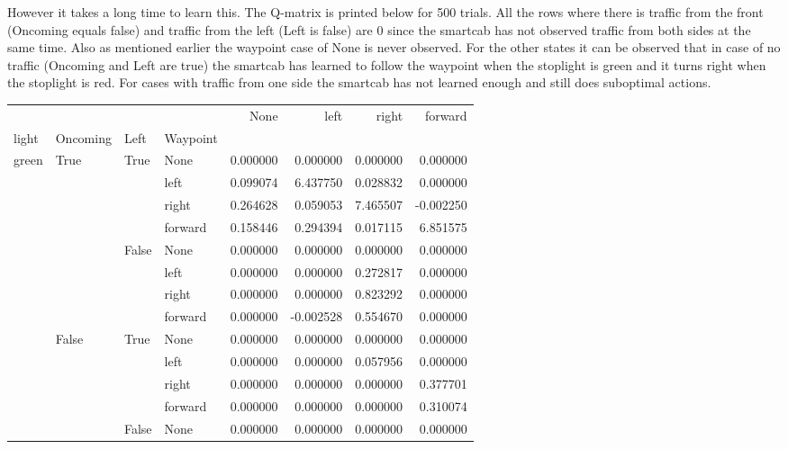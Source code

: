 \documentclass{article}
\begin{document}
However it takes a long time to learn this. The Q-matrix is printed below for 500 trials. All the rows where there is traffic from the front (Oncoming equals false) and traffic from the left (Left is false) are 0 since the smartcab has not observed traffic from both sides at the same time. Also as mentioned earlier the waypoint case of None is never observed. For the other states it can be observed that in case of no traffic (Oncoming and Left are true) the smartcab has learned to follow the waypoint when the stoplight is green and it turns right when the stoplight is red. For cases with traffic from one side the smartcab has not learned enough and still does suboptimal actions. 

\begin{table}
\centering
\begin{tabular}{llllrrrr}
\toprule
      &       &       &         &       None &      left &     right &   forward \\
light & Oncoming & Left & Waypoint &           &           &           &           \\
\midrule
green & True  & True  & None &  0.000000 &  0.000000 &  0.000000 &  0.000000 \\
      &       &       & left &  0.099074 &  6.437750 &  0.028832 &  0.000000 \\
      &       &       & right &  0.264628 &  0.059053 &  7.465507 & -0.002250 \\
      &       &       & forward &  0.158446 &  0.294394 &  0.017115 &  6.851575 \\
      &       & False & None &  0.000000 &  0.000000 &  0.000000 &  0.000000 \\
      &       &       & left &  0.000000 &  0.000000 &  0.272817 &  0.000000 \\
      &       &       & right &  0.000000 &  0.000000 &  0.823292 &  0.000000 \\
      &       &       & forward &  0.000000 & -0.002528 &  0.554670 &  0.000000 \\
      & False & True  & None &  0.000000 &  0.000000 &  0.000000 &  0.000000 \\
      &       &       & left &  0.000000 &  0.000000 &  0.057956 &  0.000000 \\
      &       &       & right &  0.000000 &  0.000000 &  0.000000 &  0.377701 \\
      &       &       & forward &  0.000000 &  0.000000 &  0.000000 &  0.310074 \\
      &       & False & None &  0.000000 &  0.000000 &  0.000000 &  0.000000 \\

\end{tabular}
\end{table}
\end{document}
